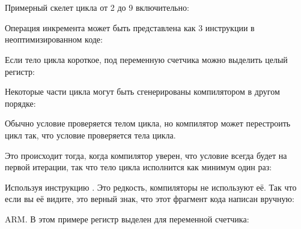 ﻿\section{\Conclusion{}}

Примерный скелет цикла от 2 до 9 включительно:



Операция инкремента может быть представлена как 3 инструкции в неоптимизированном коде:



Если тело цикла короткое, под переменную счетчика можно выделить целый регистр:



Некоторые части цикла могут быть сгенерированы компилятором в другом порядке:



Обычно условие проверяется  телом цикла, но компилятор может перестроить цикл так, 
что условие проверяется  тела цикла.

Это происходит тогда, когда компилятор уверен, что условие всегда будет  на первой итерации,
так что тело цикла исполнится как минимум один раз:



Используя инструкцию . Это редкость, компиляторы не используют её.
Так что если вы её видите, это верный знак, что этот фрагмент кода написан вручную:



ARM. 
В этом примере регистр  выделен для переменной счетчика:




